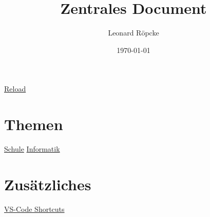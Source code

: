 \documentclass[12pt,a4paper]{article}
\title{Zentrales Document}
\author{Leonard Röpcke}
\date{\today}
\begin{document}
\maketitle
\noindent
\href{https://leonard-roepcke.github.io/Knoledge-Archive/main_docs/central_document/central_document.pdf}{Reload}
\section*{Themen}
\href{https://leonard-roepcke.github.io/Knoledge-Archive/main_docs/school/school.pdf}{Schule}
\break
\href{https://leonard-roepcke.github.io/Knoledge-Archive/main_docs/informatics/informatics.pdf}{Informatik}
\section{Zusätzliches}
\href{https://leonard-roepcke.github.io/Knoledge-Archive/knowledge/informatics/vsc_shortcuts/vsc_shortcuts.pdf}{VS-Code Shortcuts}
\end{document}
